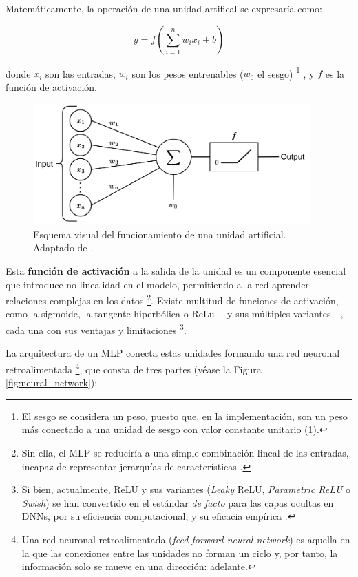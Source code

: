 Matemáticamente, la operación de una unidad artifical se expresaría como:

$$
y = f \left( \sum_{i=1}^n{w_ix_i+b} \right)
$$

donde $x_i$ son las entradas, $w_i$ son los pesos entrenables ($w_0$ el sesgo)
\footnote{
    El sesgo se considera un peso, puesto que, en la implementación, son un peso más conectado a una unidad
    de sesgo con valor constante unitario (1).
}
, y $f$ es la función de activación.

\begin{figure}[h]
    \centering
    \includegraphics[width=0.95\textwidth]{capitulos/cap_02/imagenes/Neuron_perceptron.png}
    \caption{
        Esquema visual del funcionamiento de una unidad artificial. Adaptado de 
        \cite{codeworld2022understandingMLDL}.
    } 
    \label{fig:neuron_MLP}
\end{figure}


Esta \textbf{función de activación} a la salida de la unidad es un componente esencial que introduce no 
linealidad en el modelo, permitiendo a la red aprender relaciones complejas en los datos
\footnote{
    Sin ella, el MLP se reduciría a una simple combinación lineal de las entradas, incapaz de
    representar jerarquías de características \cite{murphy2022}.
}.
Existe multitud de funciones de activación, como la sigmoide, la tangente hiperbólica o ReLu ---y sus 
múltiples variantes---, cada una con sus ventajas y limitaciones
\footnote{
    Si bien, actualmente, ReLU y sus variantes (\textit{Leaky} ReLU, \textit{Parametric ReLU} o 
    \textit{Swish}) se han convertido en el estándar \textit{de facto} para las capas ocultas en DNNs,
    por su eficiencia computacional, y su eficacia empírica \cite{vargas2021}.
}.

La arquitectura de un MLP conecta estas unidades formando una red neuronal retroalimentada
\footnote{
    Una red neuronal retroalimentada (\textit{feed-forward neural network}) es aquella en la que las 
    conexiones entre las unidades no forman un ciclo y, por tanto, la información solo se mueve en una 
    dirección: adelante.
},
que consta de tres partes (véase la Figura \ref{fig:neural_network}):

